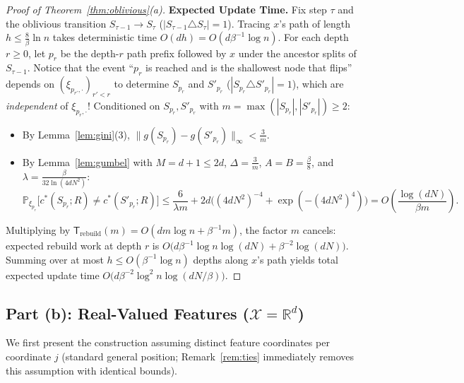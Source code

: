 \documentclass[11pt]{article}
\theoremstyle{definition}
\newcommand{\R}{\mathbb{R}}
\newcommand{\Prob}{\mathbb{P}}
\newcommand{\calX}{\mathcal{X}}
\begin{document}
\begin{proof}[Proof of Theorem~\ref{thm:oblivious}(a)]
\textbf{Expected Update Time.}
Fix step $\tau$ and the oblivious transition $S_{\tau-1} \to S_\tau$ ($|S_{\tau-1} \triangle S_\tau| = 1$). Tracing $x$'s path of length $h \le \frac{8}{\beta}\ln n$ takes deterministic time $O(d h) = O(d \beta^{-1} \log n)$. For each depth $r \ge 0$, let $p_r$ be the depth-$r$ path prefix followed by $x$ under the ancestor splits of $S_{\tau-1}$. Notice that the event ``$p_r$ is reached and is the shallowest node that flips'' depends on $(\xi_{p_{r'}, \cdot})_{r' < r}$ to determine $S_{p_r}$ and $S'_{p_r}$ ($|S_{p_r} \triangle S'_{p_r}| = 1$), which are \emph{independent} of $\xi_{p_r, \cdot}$! Conditioned on $S_{p_r}, S'_{p_r}$ with $m = \max(|S_{p_r}|, |S'_{p_r}|) \ge 2$:
\begin{itemize}[leftmargin=1.5em,itemsep=1pt]
    \item By Lemma~\ref{lem:gini}(3), $\|g(S_{p_r}) - g(S'_{p_r})\|_\infty < \frac{3}{m}$.
    \item By Lemma~\ref{lem:gumbel} with $M = d + 1 \le 2d$, $\Delta = \frac{3}{m}$, $A = B = \frac{\beta}{8}$, and $\lambda = \frac{\beta}{32 \ln(4dN^2)}$:
    \[
        \Prob_{\xi_{p_r}}\big[c^*(S_{p_r}; R) \ne c^*(S'_{p_r}; R)\big] \le \frac{6}{\lambda m} + 2d \Big((4dN^2)^{-4} + \exp(-(4dN^2)^4)\Big) = O\left(\frac{\log(dN)}{\beta m}\right).
    \]
\end{itemize}
Multiplying by $\mathsf{T}_{\mathrm{rebuild}}(m) = O(d m \log n + \beta^{-1} m)$, the factor $m$ cancels: expected rebuild work at depth $r$ is $O\big(d \beta^{-1} \log n \log(dN) + \beta^{-2}\log(dN)\big)$. Summing over at most $h \le O(\beta^{-1}\log n)$ depths along $x$'s path yields total expected update time $O\big(d \beta^{-2} \log^2 n \log(dN/\beta)\big)$.
\end{proof}

\subsection{Part (b): Real-Valued Features (\texorpdfstring{$\calX = \R^d$}{X = R\^{}d})}

We first present the construction assuming distinct feature coordinates per coordinate $j$ (standard general position; Remark~\ref{rem:ties} immediately removes this assumption with identical bounds).
\end{document}
